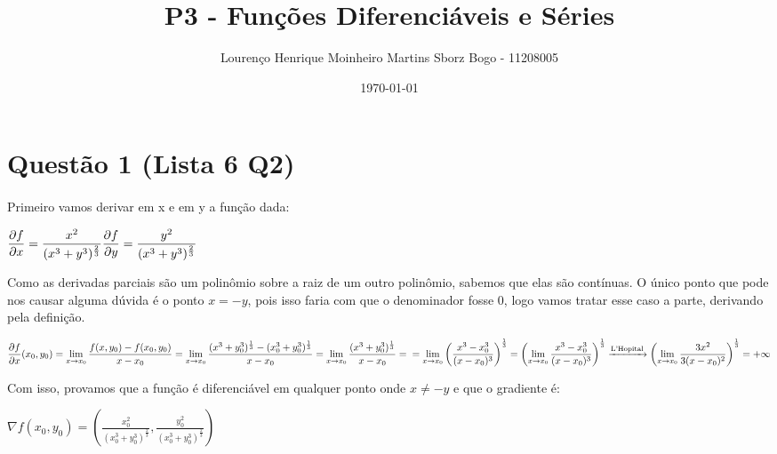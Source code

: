 \documentclass[11pt]{article}
\author{Lourenço Henrique Moinheiro Martins Sborz Bogo - 11208005}
\date{\today}
\title{P3 - Funções Diferenciáveis e Séries}
\begin{document}
\maketitle
\tableofcontents

\newpage

\section{Questão 1 (Lista 6 Q2)}
\label{sec:org56982f8}
\paragraph{}Primeiro vamos derivar em x e em y a função dada:

\(\displaystyle\\
  \frac{\partial{f}}{\partial{x}} = \frac{x^2}{(x^3+y^3)^{\frac{2}{3}}}\\
  \frac{\partial{f}}{\partial{y}} = \frac{y^2}{(x^3+y^3)^{\frac{2}{3}}}\)


Como as derivadas parciais são um polinômio sobre a
raiz de um outro polinômio, sabemos que elas são contínuas.
O único ponto que pode nos causar alguma dúvida é
o ponto \(x = -y\), pois isso faria com que o denominador
fosse 0, logo vamos tratar esse caso a parte, derivando
pela definição.

\(\displaystyle
  \frac{\partial{f}}{\partial{x}}(x_0, y_0) = 
  \lim_{x \to x_0}{\frac{f(x, y_0)-f(x_0, y_0)}{x-x_0}} =
  \lim_{x \to x_0}{\frac{(x^3+y_0^3)^{\frac{1}{3}}-(x_0^3+y_0^3)^{\frac{1}{3}}}{x-x_0}} = 
  \lim_{x \to x_0}{\frac{(x^3+y_0^3)^{\frac{1}{3}}}{x-x_0}} = \\
  = \lim_{x \to x_0}{\left(\frac{x^3-x_0^3}{(x-x_0)^3}\right)^{\frac{1}{3}}} = 
  \left(\lim_{x \to x_0}{\frac{x^3-x_0^3}{(x-x_0)^3}}\right)^{\frac{1}{3}} \xrightarrow{\text{L'Hopital}}
  \left(\lim_{x \to x_0}{\frac{3x^2}{3(x-x_0)^2}}\right)^{\frac{1}{3}} = +\infty\)

Com isso, provamos que a função é diferenciável em
qualquer ponto onde \(x \neq -y\) e que o gradiente é:

\(\displaystyle\nabla{f(x_0, y_0)} = \left(\frac{x_0^2}{(x_0^3+y_0^3)^{\frac{2}{3}}}, \frac{y_0^2}{(x_0^3+y_0^3)^{\frac{2}{3}}}\right)\)
\end{document}

